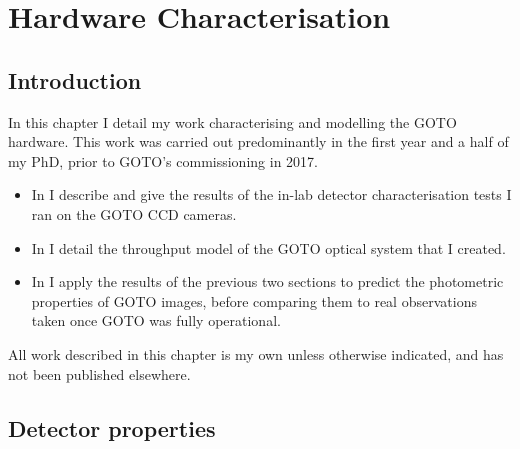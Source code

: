 
\chapter{Hardware Characterisation}
\label{chap:hardware}


\chaptoc{}


\section{Introduction}
\label{sec:hardware_intro}


\begin{colsection}

In this chapter I detail my work characterising and modelling the GOTO hardware. This work was carried out predominantly in the first year and a half of my PhD, prior to GOTO's commissioning in 2017.
%
\begin{itemize}
    \item In  I describe and give the results of the in-lab detector characterisation tests I ran on the GOTO CCD cameras.
    \item In  I detail the throughput model of the GOTO optical system that I created.
    \item In  I apply the results of the previous two sections to predict the photometric properties of GOTO images, before comparing them to real observations taken once GOTO was fully operational.
\end{itemize}
%
All work described in this chapter is my own unless otherwise indicated, and has not been published elsewhere.

\newpage

\end{colsection}


\section{Detector properties}
\label{sec:detectors}


